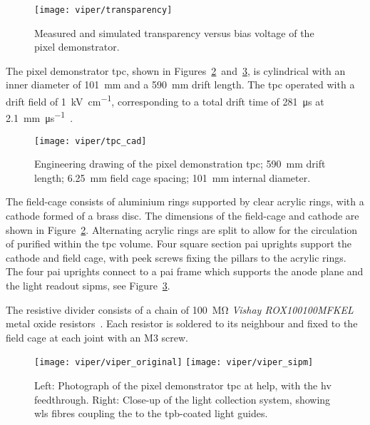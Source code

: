 \begin{figure}[htb]
	\centering
	\texttt{[image: viper/transparency]}
	\caption[Pixel demonstrator charge readout transparency]{%
		Measured and simulated transparency versus bias voltage of the \AC{} pixel demonstrator.~\cite{francypants}
	}
	\label{fig:viper_transparency}
\end{figure}

The pixel demonstrator \gls{tpc}, shown in Figures~\ref{fig:viper_cad}~and~\ref{fig:viper_v1per}, is cylindrical with an inner diameter of \SI{101}{\milli\metre} and a \SI{590}{\milli\metre} drift length. 
The \gls{tpc} operated with a drift field of \SI{1}{\kilo\volt\per\centi\metre}, corresponding to a total drift time of \SI{281}{\micro\second} at \SI{2.1}{\milli\metre\per\micro\second}~\cite{protoLASER}.

\begin{figure}[htb]
	\centering
	\texttt{[image: viper/tpc\_cad]}
	\caption[Engineering drawing of pixel demonstrator ]{%
		Engineering drawing of the pixel demonstration \acrshort{tpc}; \SI{590}{\milli\metre} drift length; \SI{6.25}{\milli\metre} field cage spacing; \SI{101}{\milli\metre} internal diameter.
	}
	\label{fig:viper_cad}
\end{figure}
 
The field-cage consists of aluminium rings supported by clear acrylic rings, with a cathode formed of a brass disc. 
The dimensions of the field-cage and cathode are shown in Figure~\ref{fig:viper_cad}.
Alternating acrylic rings are split to allow for the circulation of purified \lar{} within the \gls{tpc} volume.
Four square section \gls{pai} uprights support the cathode and field cage, with \gls{peek} screws fixing the pillars to the acrylic rings.
The four \gls{pai} uprights connect to a \gls{pai} frame which supports the anode plane and the light readout \glspl{sipm}, see Figure~\ref{fig:viper_v1per}.   

The resistive divider consists of a chain of \SI{100}{\mega\ohm} \emph{Vishay ROX100100MFKEL} metal oxide resistors~\cite{vishay}.
Each resistor is soldered to its neighbour and fixed to the field cage at each joint with an M3 screw.   

\begin{figure}[htb]
	\centering
	\texttt{[image: viper/viper\_original]}
	\texttt{[image: viper/viper\_sipm]}
	\caption[Pixel demonstrator close-up]{%
		Left: Photograph of the  pixel demonstrator \acrshort{tpc} at \acrshort{help}, with the \acrshort{hv} feedthrough.
		Right: Close-up of the light collection system, showing \acrshort{wls} fibres coupling the  to the \acrshort{tpb}-coated light guides.
	}
	\label{fig:viper_v1per}
\end{figure}

